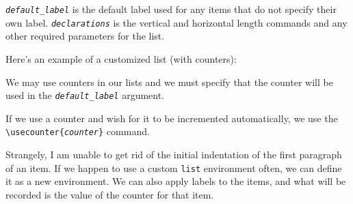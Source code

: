 \documentclass{amsart}
\newcommand{\ttt}[1]{\texttt{#1}}
\newcommand{\emttt}[1]{\texttt{\emph{#1}}}
\begin{document}
	\emttt{default\_label} is the default label used for any items that
	do not specify their own label.
	\emttt{declarations} is the vertical and horizontal length commands 
	and any other required parameters for the list.

	Here's an example of a customized list (with counters):
	\begin{list}{\textbf{Rule :}}
					{\setlength{\leftmargin}{3 cm}
					 \setlength{\rightmargin}{3 cm}
					 \setlength{\labelsep}{1 cm}
					 }
		\item	
			We may use counters in our lists and we must specify that
			the counter will be used in the \emttt{default\_label} argument.
		\item
			If we use a counter and wish for it to be incremented
			automatically, we use the \\
			\verb+\usecounter{+\emttt{counter}\ttt{\}} command. 
	\end{list}
	Strangely, I am unable to get rid of the initial indentation of the
	first paragraph of an item. 
	If we happen to use a custom \ttt{list} environment often,
	we can define it as a new environment. 
	We can also apply labels to the items, and what will be recorded
	is the value of the counter for that item.
\end{document}
